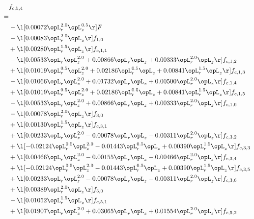 \begin{alignat}{2} 
\label{eq:f_54_1} 
& f_{c,5,4} \nonumber \\ 
 = \\ 
& - \l[  0.00072 \opL_r^{2.0} \opL_z^{0.5}  \r] F \nonumber \\ 
& - \l[  0.00083 \opL_r^{2.0} \opL_z  \r] f_{1,0} \nonumber \\ 
& + \l[  0.00280 \opL_r^{1.5} \opL_z  \r] f_{c,1,1} \nonumber \\ 
& - \l[  0.00533 \opL_r \opL_z^{2.0} +  0.00866 \opL_r \opL_z +  0.00333 \opL_r^{2.0} \opL_z  \r] f_{c,1,2} \nonumber \\ 
& + \l[  0.01019 \opL_r^{0.5} \opL_z^{2.0} +  0.02186 \opL_r^{0.5} \opL_z +  0.00841 \opL_r^{1.5} \opL_z  \r] f_{c,1,3} \nonumber \\ 
& - \l[  0.01066 \opL_r \opL_z^{2.0} +  0.01732 \opL_r \opL_z +  0.00500 \opL_r^{2.0} \opL_z  \r] f_{c,1,4} \nonumber \\ 
& + \l[  0.01019 \opL_r^{0.5} \opL_z^{2.0} +  0.02186 \opL_r^{0.5} \opL_z +  0.00841 \opL_r^{1.5} \opL_z  \r] f_{c,1,5} \nonumber \\ 
& - \l[  0.00533 \opL_r \opL_z^{2.0} +  0.00866 \opL_r \opL_z +  0.00333 \opL_r^{2.0} \opL_z  \r] f_{c,1,6} \nonumber \\ 
& - \l[  0.00078 \opL_r^{2.0} \opL_z  \r] f_{3,0} \nonumber \\ 
& + \l[  0.00130 \opL_r^{1.5} \opL_z  \r] f_{c,3,1} \nonumber \\ 
& + \l[  0.00233 \opL_r \opL_z^{2.0}   -0.00078 \opL_r \opL_z   -0.00311 \opL_r^{2.0} \opL_z  \r] f_{c,3,2} \nonumber \\ 
& + \l[  -0.02124 \opL_r^{0.5} \opL_z^{2.0}   -0.01443 \opL_r^{0.5} \opL_z +  0.00390 \opL_r^{1.5} \opL_z  \r] f_{c,3,3} \nonumber \\ 
& + \l[  0.00466 \opL_r \opL_z^{2.0}   -0.00155 \opL_r \opL_z   -0.00466 \opL_r^{2.0} \opL_z  \r] f_{c,3,4} \nonumber \\ 
& + \l[  -0.02124 \opL_r^{0.5} \opL_z^{2.0}   -0.01443 \opL_r^{0.5} \opL_z +  0.00390 \opL_r^{1.5} \opL_z  \r] f_{c,3,5} \nonumber \\ 
& + \l[  0.00233 \opL_r \opL_z^{2.0}   -0.00078 \opL_r \opL_z   -0.00311 \opL_r^{2.0} \opL_z  \r] f_{c,3,6} \nonumber \\ 
& + \l[  0.00389 \opL_r^{2.0} \opL_z  \r] f_{5,0} \nonumber \\ 
& - \l[  0.01052 \opL_r^{1.5} \opL_z  \r] f_{c,5,1} \nonumber \\ 
& + \l[  0.01907 \opL_r \opL_z^{2.0} +  0.03065 \opL_r \opL_z +  0.01554 \opL_r^{2.0} \opL_z  \r] f_{c,5,2} \nonumber \\ 

\end{alignat}
